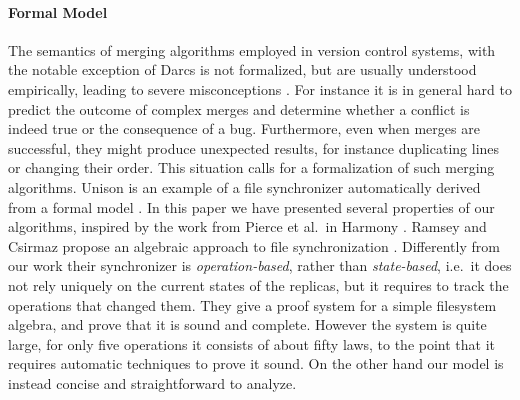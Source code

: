 \documentclass{sigplanconf}
\theoremstyle{plain}
\begin{document}
\paragraph{Formal Model}
The semantics of merging algorithms employed in version control
systems, with the notable exception of Darcs \cite{HomoPatchTheory,
  CategoryPatchTheory} is not formalized, but are usually understood
empirically, leading to severe misconceptions \cite{PierceDiff3}.
%
For instance it is in general hard to predict the outcome of complex
merges and determine whether a conflict is indeed true or the
consequence of a bug.
%
Furthermore, even when merges are successful, they might produce
unexpected results, for instance duplicating lines or changing their
order.
%
This situation calls for a formalization of such merging algorithms.
%
Unison \cite{UnisonSpec} is an example of a file synchronizer
automatically derived from a formal model \cite{Pierce98}.
%
In this paper we have presented several properties of our algorithms,
inspired by the work from Pierce et al.\ in Harmony
\cite{HarmonyOverview}.
%
Ramsey and Csirmaz propose an algebraic approach to file
synchronization \cite{Ramsey01}. 
%
Differently from our work their synchronizer is
\emph{operation-based}, rather than \emph{state-based}, i.e.\ it does
not rely uniquely on the current states of the replicas, but it
requires to track the operations that changed them.
%
They give a proof system for a simple filesystem algebra,
and prove that it is sound and complete.
%
%
However the system is quite large, for only five operations it
consists of about fifty laws, to the point that it requires automatic
techniques to prove it sound.
%
On the other hand our model is instead concise and straightforward
to analyze.
%
\end{document}
